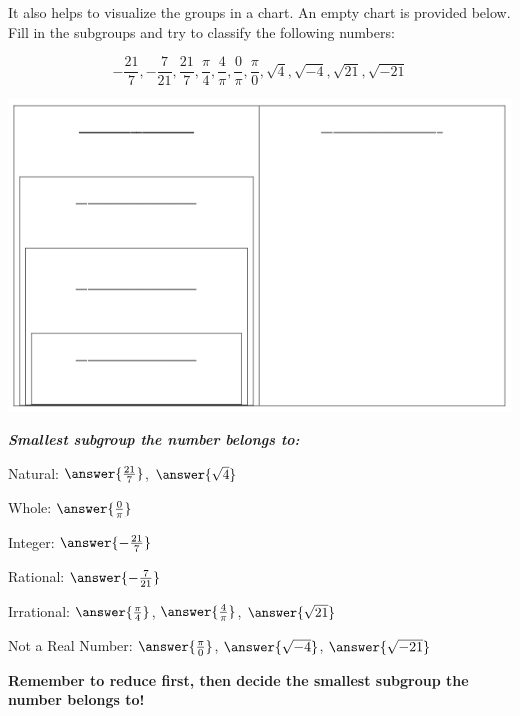 \documentclass{ximera}
\begin{document}
\begin{question}

It also helps to visualize the groups in a chart. An empty chart is provided below. Fill in the subgroups and try to classify the following numbers: 

$$ -\frac{21}{7}, -\frac{7}{21}, \frac{21}{7}, \frac{\pi}{4}, \frac{4}{\pi}, \frac{0}{\pi}, \frac{\pi}{0}, \sqrt{4}, \sqrt{-4}, \sqrt{21}, \sqrt{-21} $$

\includegraphics{realNumbersChart.png}

\textbf{\textit{Smallest subgroup the number belongs to:}}

Natural: $\answer{\frac{21}{7}}$, $\answer{\sqrt{4}}$

Whole: $\answer{\frac{0}{\pi}}$

Integer: $\answer{-\frac{21}{7}}$

Rational: $\answer{-\frac{7}{21}}$

Irrational: $\answer{\frac{\pi}{4}}$, $\answer{\frac{4}{\pi}}$, $\answer{\sqrt{21}}$

Not a Real Number: $\answer{\frac{\pi}{0}}$, $\answer{\sqrt{-4}}$, $\answer{\sqrt{-21}}$

\end{question}

\textbf{Remember to reduce first, then decide the smallest subgroup the number belongs to!}
\end{document}

